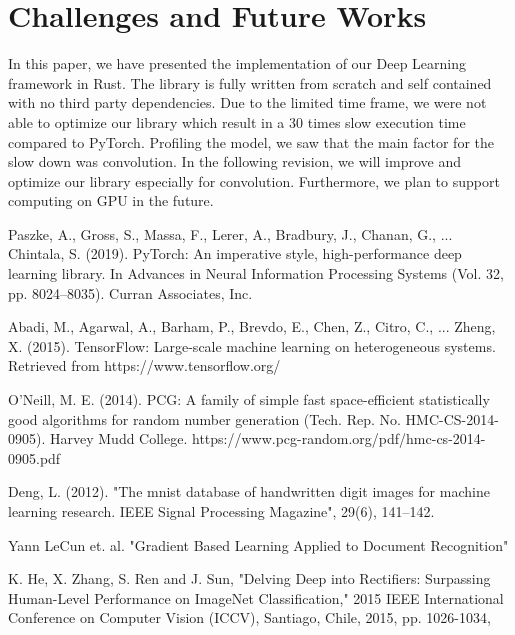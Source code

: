 \documentclass[conference]{IEEEtran}
\begin{document}
\section{Challenges and Future Works}
In this paper, we have presented the implementation of our Deep Learning framework in Rust. The library is fully written from scratch and self contained with no third party dependencies.
Due to the limited time frame, we were not able to optimize our library which result in a 30 times slow execution time compared to PyTorch. Profiling the model, we saw that the main factor for the slow down was convolution. In the following revision, we will improve and optimize our library especially for convolution. Furthermore, we plan to support computing on GPU in the future. 


\begin{thebibliography}{00}

 Paszke, A., Gross, S., Massa, F., Lerer, A., Bradbury, J., Chanan, G., ...  Chintala, S. (2019). PyTorch: An imperative style, high-performance deep learning library. In Advances in Neural Information Processing Systems (Vol. 32, pp. 8024–8035). Curran Associates, Inc.

 Abadi, M., Agarwal, A., Barham, P., Brevdo, E., Chen, Z., Citro, C., ...  Zheng, X. (2015). TensorFlow: Large-scale machine learning on heterogeneous systems. Retrieved from https://www.tensorflow.org/

 O’Neill, M. E. (2014). PCG: A family of simple fast space-efficient statistically good algorithms for random number generation (Tech. Rep. No. HMC-CS-2014-0905). Harvey Mudd College. https://www.pcg-random.org/pdf/hmc-cs-2014-0905.pdf


 Deng, L. (2012). "The mnist database of handwritten digit images for machine learning research. IEEE Signal Processing Magazine", 29(6), 141–142.

 Yann LeCun et. al. "Gradient Based Learning Applied to Document Recognition"

 K. He, X. Zhang, S. Ren and J. Sun, "Delving Deep into Rectifiers: Surpassing Human-Level Performance on ImageNet Classification," 2015 IEEE International Conference on Computer Vision (ICCV), Santiago, Chile, 2015, pp. 1026-1034,



\end{thebibliography}
\end{document}

